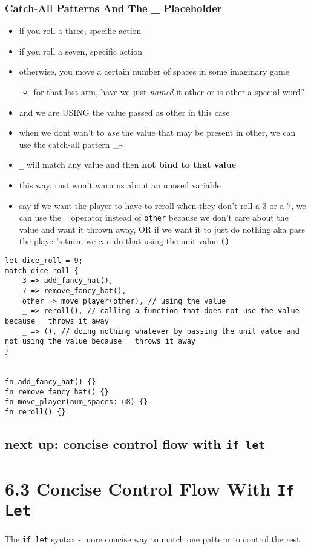 \documentclass[11pt]{article}
\begin{document}
\subsubsection{Catch-All Patterns And The \_ Placeholder}
\label{sec:org6b139f7}
\begin{itemize}
\item if you roll a three, specific action
\item if you roll a seven, specific action
\item otherwise, you move a certain number of spaces in some imaginary game
\begin{itemize}
\item for that last arm, have we just \emph{named} it other or is other a special word?
\end{itemize}
\item and we are USING the value passed as other in this case
\item when we dont wan't to \emph{use} the value that may be present in other, we can use the catch-all pattern \_\textasciitilde{}
\item \texttt{\_} will match any value and then \textbf{not bind to that value}
\item this way, rust won't warn us about an unused variable
\item say if we want the player to have to reroll when they don't roll a 3 or a 7, we can use the \texttt{\_} operator instead of \texttt{other} because we don't care about the value and want it thrown away, OR if we want it to just do nothing aka pass the player's turn, we can do that using the unit value \texttt{()}
\end{itemize}
\begin{verbatim}
let dice_roll = 9;
match dice_roll {
    3 => add_fancy_hat(),
    7 => remove_fancy_hat(),
    other => move_player(other), // using the value
    _ => reroll(), // calling a function that does not use the value because _ throws it away
    _ => (), // doing nothing whatever by passing the unit value and not using the value because _ throws it away
}


fn add_fancy_hat() {}
fn remove_fancy_hat() {}
fn move_player(num_spaces: u8) {}
fn reroll() {}
\end{verbatim}
\subsection{next up: concise control flow with \texttt{if let}}
\label{sec:org4ae7333}
\section{6.3 Concise Control Flow With \texttt{If Let}}
\label{sec:org19f304c}
The \texttt{if let} syntax - more concise way to match one pattern to control the rest
\end{document}

